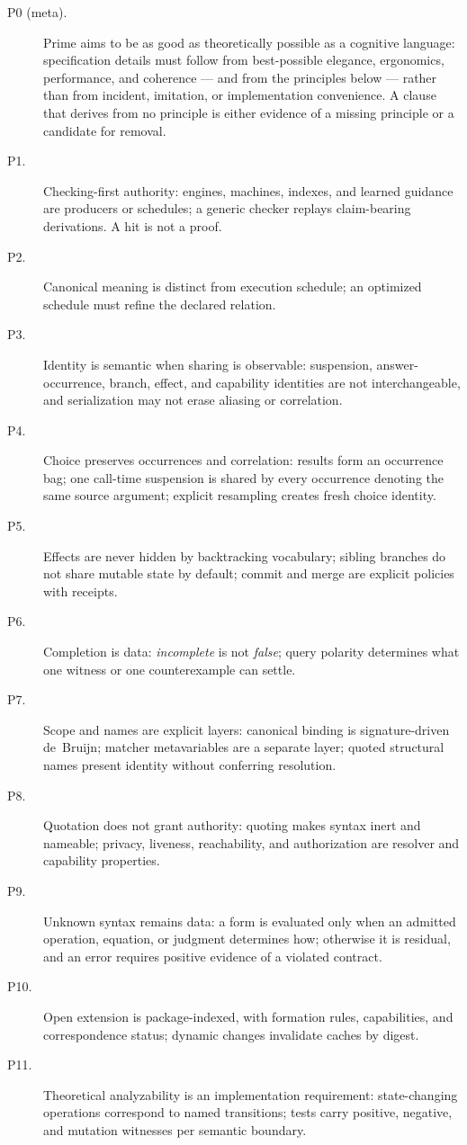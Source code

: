 \documentclass[11pt]{article}
\begin{document}
\begin{description}
\item[P0 (meta).]  Prime aims to be as good as theoretically possible as
  a cognitive language: specification details must follow from
  best-possible elegance, ergonomics, performance, and coherence --- and
  from the principles below --- rather than from incident, imitation, or
  implementation convenience.  A clause that derives from no principle is
  either evidence of a missing principle or a candidate for removal.
\item[P1.]  Checking-first authority: engines, machines, indexes, and
  learned guidance are producers or schedules; a generic checker replays
  claim-bearing derivations.  A hit is not a proof.
\item[P2.]  Canonical meaning is distinct from execution schedule; an
  optimized schedule must refine the declared relation.
\item[P3.]  Identity is semantic when sharing is observable: suspension,
  answer-occurrence, branch, effect, and capability identities are not
  interchangeable, and serialization may not erase aliasing or
  correlation.
\item[P4.]  Choice preserves occurrences and correlation: results form an
  occurrence bag; one call-time suspension is shared by every occurrence
  denoting the same source argument; explicit resampling creates fresh
  choice identity.
\item[P5.]  Effects are never hidden by backtracking vocabulary; sibling
  branches do not share mutable state by default; commit and merge are
  explicit policies with receipts.
\item[P6.]  Completion is data: \emph{incomplete} is not \emph{false};
  query polarity determines what one witness or one counterexample can
  settle.
\item[P7.]  Scope and names are explicit layers: canonical binding is
  signature-driven de~Bruijn; matcher metavariables are a separate layer;
  quoted structural names present identity without conferring resolution.
\item[P8.]  Quotation does not grant authority: quoting makes syntax
  inert and nameable; privacy, liveness, reachability, and authorization
  are resolver and capability properties.
\item[P9.]  Unknown syntax remains data: a form is evaluated only when an
  admitted operation, equation, or judgment determines how; otherwise it
  is residual, and an error requires positive evidence of a violated
  contract.
\item[P10.]  Open extension is package-indexed, with formation rules,
  capabilities, and correspondence status; dynamic changes invalidate
  caches by digest.
\item[P11.]  Theoretical analyzability is an implementation requirement:
  state-changing operations correspond to named transitions; tests carry
  positive, negative, and mutation witnesses per semantic boundary.
\end{description}
\end{document}
